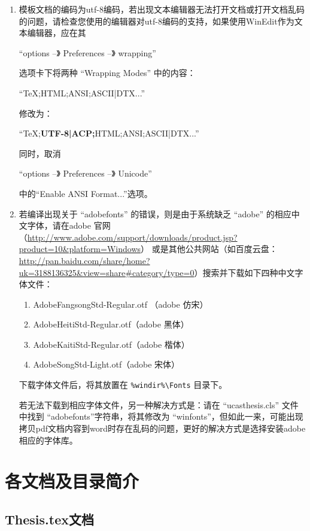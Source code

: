 \begin{enumerate}
  \item 模板文档的编码为utf-8编码，若出现文本编辑器无法打开文档或打开文档乱码的问题，请检查您使用的编辑器对utf-8编码的支持，如果使用WinEdit作为文本编辑器，应在其

  “options --》 Preferences --》 wrapping”

  选项卡下将两种 “Wrapping Modes” 中的内容：

  “TeX;HTML;ANSI;ASCII|DTX...”

  修改为：

  “TeX;\textbf{UTF-8|ACP;}HTML;ANSI;ASCII|DTX...”

  同时，取消

  “options --》 Preferences --》 Unicode”

  中的“Enable ANSI Format...”选项。

  \item 若编译出现关于 “adobefonts” 的错误，则是由于系统缺乏 “adobe” 的相应中文字体，请在adobe 官网（\url{http://www.adobe.com/support/downloads/product.jsp?product=10&platform=Windows}） 或是其他公共网站（如百度云盘：\url{http://pan.baidu.com/share/home?uk=3188136325&view=share#category/type=0}）搜索并下载如下四种中文字体文件：
      \begin{enumerate}
        \item AdobeFangsongStd-Regular.otf （adobe 仿宋）
        \item AdobeHeitiStd-Regular.otf（adobe 黑体）
        \item AdobeKaitiStd-Regular.otf（adobe 楷体）
        \item AdobeSongStd-Light.otf（adobe 宋体）
      \end{enumerate}

	  下载字体文件后，将其放置在 \verb|%windir%\Fonts| 目录下。
	  
      若无法下载到相应字体文件，另一种解决方式是：请在 “ucasthesis.cls” 文件中找到 “adobefonts”字符串，将其修改为 “winfonts”，但如此一来，可能出现拷贝pdf文档内容到word时存在乱码的问题，更好的解决方式是选择安装adobe相应的字体库。
\end{enumerate}

\section{各文档及目录简介 }

\subsection{Thesis.tex文档 }

